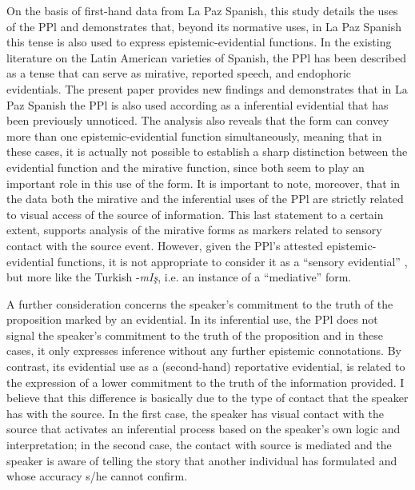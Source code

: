 \documentclass[output=paper]{langsci/langscibook}
\begin{document}
On the basis of first-hand data from La Paz Spanish, this study details the uses of the PPl and demonstrates that, beyond its normative uses, in La Paz Spanish this tense is also used to express epistemic-evidential functions. In the existing literature on the Latin American varieties of Spanish, the PPl has been described as a tense that can serve as mirative, reported speech, and endophoric evidentials. The present paper provides new findings and demonstrates that in La Paz Spanish the PPl is also used according as a inferential evidential that has been previously unnoticed. The analysis also reveals that the form can convey more than one epistemic-evidential function simultaneously, meaning that in these cases, it is actually not possible to establish a sharp distinction between the evidential function and the mirative function, since both seem to play an important role in this use of the form. It is important to note, moreover, that in the data both the mirative and the inferential uses of the PPl are strictly related to visual access of the source of information. This last statement to a certain extent, supports  analysis of the mirative forms as markers related to sensory contact with the source event. However, given the PPl’s attested epistemic-evidential functions, it is not appropriate to consider it as a “sensory evidential” \citep{Hill2012}, but more like the Turkish -\textit{mIş}, i.e. an instance of a “mediative” \citep{Lazard1999} form.

A further consideration concerns the speaker’s commitment to the truth of the proposition marked by an evidential. In its inferential use, the PPl does not signal the speaker’s commitment to the truth of the proposition and in these cases, it only expresses inference without any further epistemic connotations. By contrast, its evidential use as a (second-hand) reportative evidential, is related to the expression of a lower commitment to the truth of the information provided. I believe that this difference is basically due to the type of contact that the speaker has with the source. In the first case, the speaker has visual contact with the source that activates an inferential process based on the speaker’s own logic and interpretation; in the second case, the contact with source is mediated and the speaker is aware of telling the story that another individual has formulated and whose accuracy s/he cannot confirm. 
\end{document}
